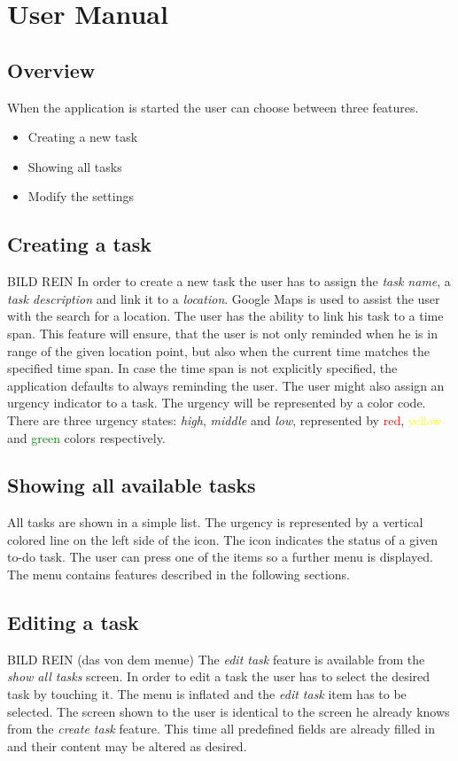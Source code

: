 \section{User Manual}
\subsection{Overview}
When the application is started the user can choose between three features.
\begin{itemize}
  \item Creating a new task
  \item Showing all tasks
  \item Modify the settings
\end{itemize}
\subsection{Creating a task}
BILD REIN
In order to create a new task the user has to assign the \emph{task name}, a
\emph{task description} and link it to a \emph{location}. Google Maps is used to
assist the user with the search for a location.
\newline
\newline
The user has the ability to link
his task to a time span. This feature will ensure, that the user is not only
reminded when he is in range of the given location point, but also when the
current time matches the specified time span. In case the time span is not
explicitly specified, the application defaults to always reminding the user. The
user might also assign an urgency indicator to a task. The urgency will be
represented by a color code. There are three urgency states: \emph{high},
\emph{middle} and \emph{low}, represented by \textcolor{red}{red},
\textcolor{yellow}{yellow} and \textcolor{green}{green} colors respectively.
\subsection{Showing all available tasks}
All tasks are shown in a simple list. The urgency is represented by a
vertical colored line on the left side of the icon. The icon indicates the status of a
given to-do task. The user can press one of the items so a further menu is
displayed.
The menu contains features described in the following sections.
\subsection{Editing a task}
BILD REIN (das von dem menue)
The \emph{edit task} feature is available from the \emph{show all tasks} screen.
In order to edit a task the user has to select the desired task by touching it.
The menu is inflated and the \emph{edit task} item has to be selected.
\newline
\newline
The screen shown to the user is identical to the screen he already
knows from the \emph{create task} feature. This time all predefined fields are
already filled in and their content may be altered as desired.
